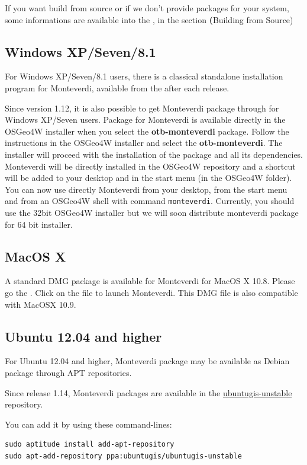 If you want build from source or if we don't provide packages for your system, some informations are available into the \sg, in the section \textbf(Building from Source)

\subsection{Windows XP/Seven/8.1}
For Windows XP/Seven/8.1 users, there is a classical standalone installation program for Monteverdi, available from the \download after each release. 

Since version 1.12, it is also possible to get Monteverdi package through \osgeow for Windows XP/Seven users. Package for Monteverdi is available directly in the OSGeo4W installer when you select the \textbf{otb-monteverdi} package. Follow the instructions in the OSGeo4W installer and select the \textbf{otb-monteverdi}. The installer will proceed with the installation of the package and all its dependencies. Monteverdi will be directly installed in the OSGeo4W repository and a shortcut will be added to your desktop and in the start menu (in the OSGeo4W folder). You can now use directly Monteverdi from your desktop, from the start menu and from an OSGeo4W shell with command \texttt{monteverdi}. Currently, you should use the 32bit OSGeo4W installer but we will soon distribute monteverdi package for 64 bit installer. 

\subsection{MacOS X}
A standard DMG package is available for Monteverdi for MacOS X 10.8. Please go the \download.
Click on the file to launch Monteverdi. This DMG file is also compatible with MacOSX 10.9.

\subsection{Ubuntu 12.04 and higher}
For Ubuntu 12.04 and higher, Monteverdi package may be available as Debian package through APT repositories.

Since release 1.14, Monteverdi packages are available in the
\href{https://launchpad.net/~ubuntugis/+archive/ubuntugis-unstable}{ubuntugis-unstable} repository.

You can add it by using these command-lines:
\begin{verbatim}
sudo aptitude install add-apt-repository
sudo apt-add-repository ppa:ubuntugis/ubuntugis-unstable
\end{verbatim}


